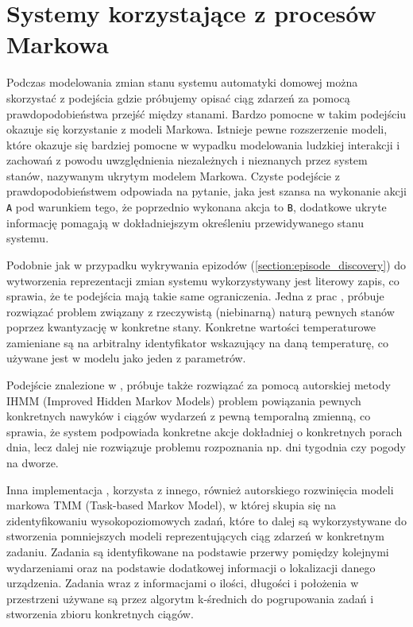 \section{Systemy korzystające z procesów Markowa}
Podczas modelowania zmian stanu systemu automatyki domowej można skorzystać z podejścia gdzie próbujemy opisać ciąg zdarzeń za pomocą prawdopodobieństwa przejść między stanami. Bardzo pomocne w takim podejściu okazuje się korzystanie z modeli Markowa. Istnieje pewne rozszerzenie modeli, które okazuje się bardziej pomocne w wypadku modelowania ludzkiej interakcji i zachowań z powodu uwzględnienia niezależnych i nieznanych przez system stanów, nazywanym ukrytym modelem Markowa. Czyste podejście z prawdopodobieństwem odpowiada na pytanie, jaka jest szansa na wykonanie akcji \verb+A+ pod warunkiem tego, że poprzednio wykonana akcja to \verb+B+, dodatkowe ukryte informację pomagają w dokładniejszym określeniu przewidywanego stanu systemu.

Podobnie jak w przypadku wykrywania epizodów (\ref{section:episode_discovery}) do wytworzenia reprezentacji zmian systemu wykorzystywany jest literowy zapis, co sprawia, że te podejścia mają takie same ograniczenia. Jedna z prac \cite{markov_1}, próbuje rozwiązać problem związany z rzeczywistą (niebinarną) naturą pewnych stanów poprzez kwantyzację w konkretne stany. Konkretne wartości temperaturowe zamieniane są na arbitralny identyfikator wskazujący na daną temperaturę, co używane jest w modelu jako jeden z parametrów.

Podejście znalezione w \cite{markov_1}, próbuje także rozwiązać za pomocą autorskiej metody IHMM (Improved Hidden Markov Models) problem powiązania pewnych konkretnych nawyków i ciągów wydarzeń z pewną temporalną zmienną, co sprawia, że system podpowiada konkretne akcje dokładniej o konkretnych porach dnia, lecz dalej nie rozwiązuje problemu rozpoznania np. dni tygodnia czy pogody na dworze.

Inna implementacja \cite{markov_2}, korzysta z innego, również autorskiego rozwinięcia modeli markowa TMM (Task-based Markov Model), w której skupia się na zidentyfikowaniu wysokopoziomowych zadań, które to dalej są wykorzystywane do stworzenia pomniejszych modeli reprezentujących ciąg zdarzeń w konkretnym zadaniu. Zadania są identyfikowane na podstawie przerwy pomiędzy kolejnymi wydarzeniami oraz na podstawie dodatkowej informacji o lokalizacji danego urządzenia. Zadania wraz z informacjami o ilości, długości i położenia w przestrzeni używane są przez algorytm k-średnich do pogrupowania zadań i stworzenia zbioru konkretnych ciągów.

